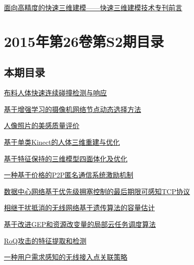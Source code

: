 \documentclass[a4paper]{article}
\begin{document}
\href{http://www.jos.org.cn/ch/reader/download_pdf.aspx?file_no=5091&year_id=2016&quarter_id=10&falg=1}{面向高精度的快速三维建模——快速三维建模技术专刊前言}


\section{\textbf{2015年第26卷第S2期目录}}
\subsection{本期目录}
\href{http://www.jos.org.cn/ch/reader/download_pdf.aspx?file_no=15010&year_id=2015&quarter_id=S2&falg=1}{布料人体快速连续碰撞检测与响应}

\href{http://www.jos.org.cn/ch/reader/download_pdf.aspx?file_no=15011&year_id=2015&quarter_id=S2&falg=1}{基于增强学习的摄像机网络节点动态选择方法}

\href{http://www.jos.org.cn/ch/reader/download_pdf.aspx?file_no=15012&year_id=2015&quarter_id=S2&falg=1}{人像照片的美感质量评价}

\href{http://www.jos.org.cn/ch/reader/download_pdf.aspx?file_no=15013&year_id=2015&quarter_id=S2&falg=1}{基于单类Kinect的人体三维重建与优化}

\href{http://www.jos.org.cn/ch/reader/download_pdf.aspx?file_no=15014&year_id=2015&quarter_id=S2&falg=1}{基于特征保持的三维模型四面体化及优化}

\href{http://www.jos.org.cn/ch/reader/download_pdf.aspx?file_no=15015&year_id=2015&quarter_id=S2&falg=1}{一种基于价格的P2P匿名通信系统激励机制}

\href{http://www.jos.org.cn/ch/reader/download_pdf.aspx?file_no=15016&year_id=2015&quarter_id=S2&falg=1}{数据中心网络基于优先级拥塞控制的最后期限可感知TCP协议}

\href{http://www.jos.org.cn/ch/reader/download_pdf.aspx?file_no=15017&year_id=2015&quarter_id=S2&falg=1}{相继干扰抵消的无线网络基于遗传算法的容量估计}

\href{http://www.jos.org.cn/ch/reader/download_pdf.aspx?file_no=15018&year_id=2015&quarter_id=S2&falg=1}{基于改进GEP和资源改变量的局部云任务调度算法}

\href{http://www.jos.org.cn/ch/reader/download_pdf.aspx?file_no=15019&year_id=2015&quarter_id=S2&falg=1}{RoQ攻击的特征提取和检测}

\href{http://www.jos.org.cn/ch/reader/download_pdf.aspx?file_no=15020&year_id=2015&quarter_id=S2&falg=1}{一种用户需求感知的无线接入点关联策略}
\end{document}
